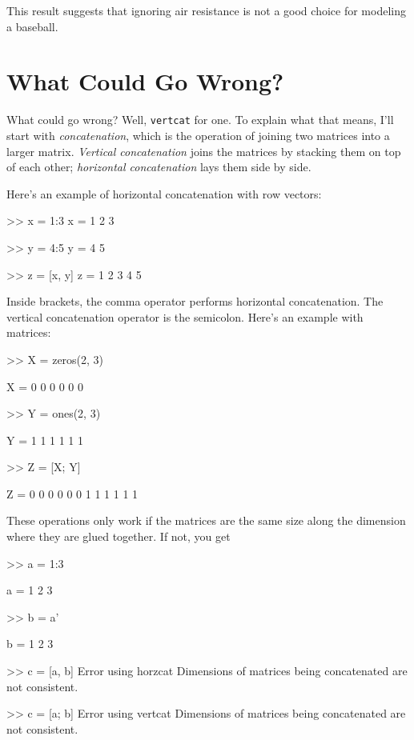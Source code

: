 This result suggests that ignoring air resistance is not a good choice for modeling a baseball.


\section{What Could Go Wrong?}

What could go wrong?  Well, \lstinline{vertcat} for one.  To explain
what that means, I'll start with \emph{concatenation}, which is
the operation of joining two matrices into a larger matrix.
\emph{Vertical concatenation} joins the matrices by stacking them on
top of each other; \emph{horizontal concatenation} lays them
side by side.


Here's an example of horizontal concatenation with row vectors:

\begin{code}
>> x = 1:3
x = 1     2     3

>> y = 4:5
y = 4     5

>> z = [x, y]
z = 1     2     3     4     5
\end{code}

Inside brackets, the comma operator performs horizontal concatenation.
The vertical concatenation operator is the semicolon.  Here's an
example with matrices:


\begin{code}
>> X = zeros(2, 3)

X =  0     0     0
     0     0     0

>> Y = ones(2, 3)

Y =  1     1     1
     1     1     1

>> Z = [X; Y]

Z =  0     0     0
     0     0     0
     1     1     1
     1     1     1
\end{code}

These operations only work if the matrices are the same size along
the dimension where they are glued together.  If not, you get

\begin{code}
>> a = 1:3

a = 1     2     3

>> b = a'

b =  1
     2
     3

>> c = [a, b]
Error using horzcat
Dimensions of matrices being concatenated are not consistent.

>> c = [a; b]
Error using vertcat
Dimensions of matrices being concatenated are not consistent.
\end{code}

